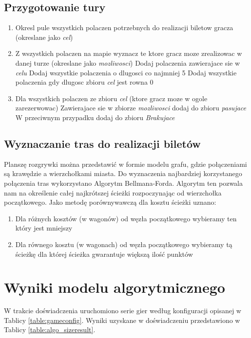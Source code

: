 \documentclass[12pt, oneside]{report}
\begin{document}
\subsection{Przygotowanie tury}
\begin{enumerate}
	\item Okresl pule wszystkich polaczen potrzebnych do realizacji biletow gracza (okreslane jako \textit{cel})
	\item Z wszystkich polaczen na mapie wyznacz te ktore gracz moze zrealizowac w danej turze (okreslane jako \textit{mozliwosci})
	\subitem Dodaj polaczenia zawierajace sie w \textit{celu}
	\subitem Dodaj wszystkie polaczenia o dlugosci co najmniej 5
	\subitem Dodaj wszystkie polaczenia gdy dlugosc zbioru \textit{cel} jest rowna 0
	\item Dla wszystkich polaczen ze zbioru \textit{cel} (ktore gracz moze w ogole zarezerwowac)
	\subitem Zawierajace sie w zbiorze \textit{mozliwosci} dodaj do zbioru \textit{pasujace}
	\subitem W przeciwnym przypadku dodaj do zbioru \textit{Brakujace}
	
\end{enumerate}
\subsection{Wyznaczanie tras do realizacji biletów}
Planszę rozgrywki można przedstawić w formie modelu grafu, gdzie połączeniami są krawędzie a wierzchołkami miasta. Do wyznaczenia najbardziej korzystanego połączenia tras wykorzystano Algorytm Bellmana-Forda. Algorytm ten pozwala nam na określenie całej najkrótszej ścieżki rozpoczynając od wierzchołka początkowego. Jako metodę porównywawczą dla kosztu ścieżki uznano:
\begin{enumerate}
	\item Dla różnych kosztów (w wagonów) od węzła początkowego wybieramy ten który jest mniejszy
	\item Dla równego kosztu (w wagonach) od węzła początkowego wybieramy tą ścieżkę dla której ścieżka gwarantuje większą ilość punktów
\end{enumerate}
\section{Wyniki modelu algorytmicznego}
W trakcie doświadczenia uruchomiono serie gier według konfiguracji opisanej w Tablicy \ref{table:gameconfig}. Wyniki uzyskane w doświadczeniu przedstawiono w Tablicy \ref{table:algo_sizeresult}.
\end{document}
